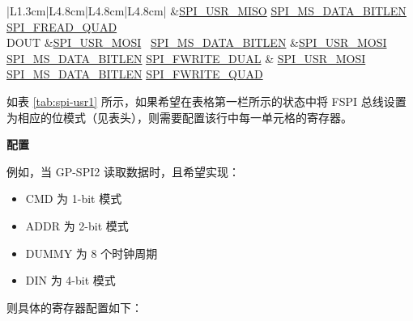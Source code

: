 \documentclass[main\_\_CN.tex]{subfiles}
\begin{document}
\begin{longtable}[c]{ |L{1.3cm}|L{4.8cm}|L{4.8cm}|L{4.8cm}| }
     &\hyperref[fielddesc:SPIUSRMISO]{SPI\_USR\_MISO}
     \hyperref[fielddesc:SPIMSDATABITLEN]{SPI\_MS\_DATA\_BITLEN}
    \hyperref[fielddesc:SPIFREADQUAD]{SPI\_FREAD\_QUAD}\\
     \hline
DOUT &\hyperref[fielddesc:SPIUSRMOSI]{SPI\_USR\_MOSI}       \
      \hyperref[fielddesc:SPIMSDATABITLEN]{SPI\_MS\_DATA\_BITLEN}
     &\hyperref[fielddesc:SPIUSRMOSI]{SPI\_USR\_MOSI}
     \hyperref[fielddesc:SPIMSDATABITLEN]{SPI\_MS\_DATA\_BITLEN}      \hyperref[fielddesc:SPIFWRITEDUAL]{SPI\_FWRITE\_DUAL} &
    \hyperref[fielddesc:SPIUSRMOSI]{SPI\_USR\_MOSI}
     \hyperref[fielddesc:SPIMSDATABITLEN]{SPI\_MS\_DATA\_BITLEN}      \hyperref[fielddesc:SPIFWRITEQUAD]{SPI\_FWRITE\_QUAD} \\
     \hline
\end{longtable}

如表 \ref{tab:spi-usr1} 所示，如果希望在表格第一栏所示的状态中将 FSPI 总线设置为相应的位模式（见表头），则需要配置该行中每一单元格的寄存器。

\textbf{配置}

例如，当 GP-SPI2 读取数据时，且希望实现：
\begin{itemize}
    \item CMD 为 1-bit 模式
    \item ADDR 为 2-bit 模式
    \item DUMMY 为 8 个时钟周期
    \item DIN 为 4-bit 模式
\end{itemize}
则具体的寄存器配置如下：
\end{document}
